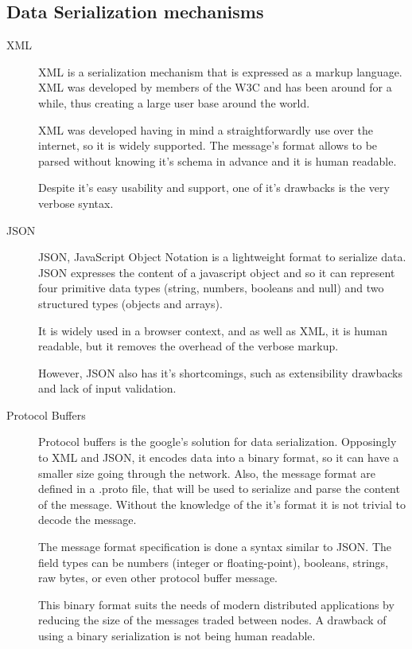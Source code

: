 \subsection{Data Serialization mechanisms}

\begin{description}

\item[XML ~\cite{xml}] XML is a serialization mechanism that is expressed as a markup language. XML was developed by members of the W3C and has been around for a while, thus creating a large user base around the world.\par
	XML was developed having in mind a straightforwardly use over the internet, so it is widely supported. The message's format allows to be parsed without knowing it's schema in advance and it is human readable.\par
	Despite it's easy usability and support, one of it's drawbacks is the very verbose syntax.

\item[JSON ~\cite{json}] JSON, JavaScript Object Notation is a lightweight format to serialize data. JSON expresses the content of a javascript object and so it can represent four primitive data types (string, numbers, booleans and null) and two structured types (objects and arrays).\par
	It is widely used in a browser context, and as well as XML, it is human readable, but it removes the overhead of the verbose markup.\par
	However, JSON also has it's shortcomings, such as extensibility drawbacks and lack of input validation.

\item[Protocol Buffers ~\cite{protocol_buffers}]
Protocol buffers is the google's solution for data serialization. Opposingly to XML and JSON, it encodes data into a binary format, so it can have a smaller size going through the network. Also, the message format are defined in a .proto file, that will be used to serialize and parse the content of the message. Without the knowledge of the it's format it is not trivial to decode the message.\par
	The message format specification is done a syntax similar to JSON. The field types can be numbers (integer or floating-point), booleans, strings, raw bytes, or even other protocol buffer message.\par
	This binary format suits the needs of modern distributed applications by reducing the size of the messages traded between nodes. A drawback of using a binary serialization is not being human readable.

\end{description}


